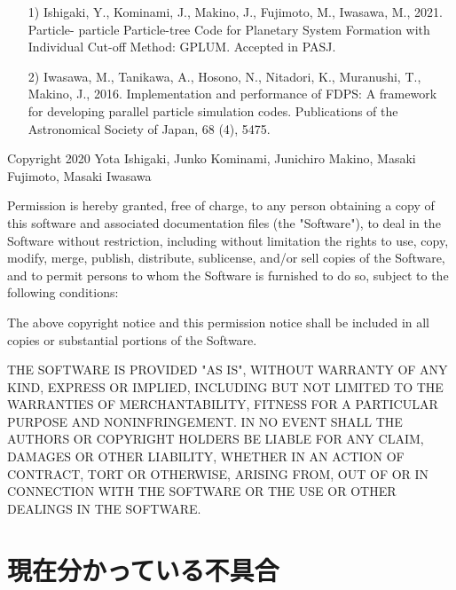 \documentclass[12pt,a4paper,dvipdfmx]{jsarticle}
\begin{document}
\begin{itemize}
\item[1)]
Ishigaki, Y., Kominami, J., Makino, J., Fujimoto, M., Iwasawa, M., 2021. 
Particle- particle Particle-tree Code for Planetary System Formation with Individual Cut-off Method: GPLUM. Accepted in PASJ.

\item[2)]
Iwasawa, M., Tanikawa, A., Hosono, N., Nitadori, K., Muranushi, T., Makino, J., 2016. Implementation and performance of FDPS: A framework for developing parallel particle simulation codes. Publications of the Astronomical Society of Japan, 68 (4), 5475.
\end{itemize}

Copyright 2020 Yota Ishigaki, Junko Kominami, Junichiro Makino, Masaki Fujimoto, Masaki Iwasawa

Permission is hereby granted, free of charge, to any person obtaining a copy of this software and associated documentation files (the "Software"), to deal in the Software without restriction, including without limitation the rights to use, copy, modify, merge, publish, distribute, sublicense, and/or sell copies of the Software, and to permit persons to whom the Software is furnished to do so, subject to the following conditions:

The above copyright notice and this permission notice shall be included in all copies or substantial portions of the Software.

THE SOFTWARE IS PROVIDED "AS IS", WITHOUT WARRANTY OF ANY KIND, EXPRESS OR IMPLIED, INCLUDING BUT NOT LIMITED TO THE WARRANTIES OF MERCHANTABILITY, FITNESS FOR A PARTICULAR PURPOSE AND NONINFRINGEMENT. IN NO EVENT SHALL THE AUTHORS OR COPYRIGHT HOLDERS BE LIABLE FOR ANY CLAIM, DAMAGES OR OTHER LIABILITY, WHETHER IN AN ACTION OF CONTRACT, TORT OR OTHERWISE, ARISING FROM, OUT OF OR IN CONNECTION WITH THE SOFTWARE OR THE USE OR OTHER DEALINGS IN THE SOFTWARE.


\section{現在分かっている不具合}
\end{document}
